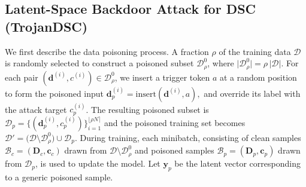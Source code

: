 \documentclass[journal]{IEEEtran}
\begin{document}
\subsection{Latent-Space Backdoor Attack for DSC (TrojanDSC)}
We first describe the data poisoning process. A fraction \(\rho\) of the training data $\mathcal{D}$ is randomly selected to construct a poisoned subset \(\mathcal{D}_{\rho}^{0}\), where \(\lvert\mathcal{D}_{\rho}^{0}\rvert = \rho\,\lvert\mathcal{D}\rvert\). For each pair \((\mathbf{d}^{(i)}, c^{(i)}) \in \mathcal{D}_{\rho}^{0}\), we insert a trigger token \(a\) at a random position to form the poisoned input
\(
\mathbf{d}_p^{(i)} = \mathrm{insert}(\mathbf{d}^{(i)}, a),
\)
and override its label with the attack target \(c_p^{(i)}\). The resulting poisoned subset is
\(
\mathcal{D}_p = \bigl\{ (\mathbf{d}_p^{(i)}, c_p^{(i)})\bigl\}_{i=1}^{\lfloor\rho N\rceil}
\)
and the poisoned training set becomes
\(
\mathcal{D}' = \bigl( \mathcal{D} \setminus \mathcal{D}_{\rho}^{0} \bigr) \cup \mathcal{D}_p.
\)
During training, each minibatch, consisting of clean samples \(\mathcal{B}_c=(\mathbf{D}_c, \mathbf{c}_c)\) drawn from \(\mathcal{D} \setminus \mathcal{D}_{\rho}^{0}\) and poisoned samples \(\mathcal{B}_p=(\mathbf{D}_p, \mathbf{c}_p)\) drawn from \(\mathcal{D}_p\), is used to update the model.
Let \(\mathbf{y}_p\)  be the latent vector corresponding to a generic poisoned sample. 

\end{document}
